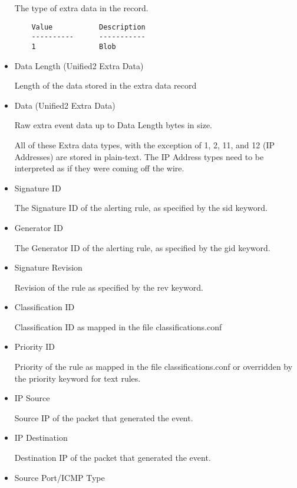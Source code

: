 \documentclass[english]{report}
\begin{document}
\begin{itemize}
    The type of extra data in the record.

\begin{verbatim}
    Value           Description 
    ----------      -----------
    1               Blob  
\end{verbatim}

\item Data Length (Unified2 Extra Data)

    Length of the data stored in the extra data record

\item Data (Unified2 Extra Data)

    Raw extra event data up to Data Length bytes in size.

    All of these Extra data types, with the exception of 1, 2, 11, and
    12 (IP Addresses) are stored in plain-text. The IP Address types
    need to be interpreted as if they were coming off the wire.

\item Signature ID

    The Signature ID of the alerting rule, as specified by the sid
    keyword.

\item Generator ID

    The Generator ID of the alerting rule, as specified by the gid
    keyword.

\item Signature Revision

    Revision of the rule as specified by the rev keyword.

\item Classification ID

    Classification ID as mapped in the file classifications.conf 

\item Priority ID

    Priority of the rule as mapped in the file classifications.conf or
    overridden by the priority keyword for text rules. 

\item IP Source

    Source IP of the packet that generated the event.

\item IP Destination

    Destination IP of the packet that generated the event.

\item Source Port/ICMP Type


\end{itemize}
\end{document}
